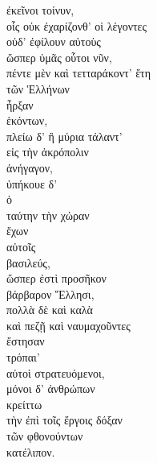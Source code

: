{\large
\begin{greek}
\noindent ἐκεῖνοι τοίνυν, \\
οἷς οὐκ ἐχαρίζονθ' οἱ λέγοντες \\
οὐδ' ἐφίλουν αὐτοὺς \\
ὥσπερ ὑμᾶς οὗτοι νῦν, \\
πέντε μὲν καὶ τετταράκοντ' ἔτη \\
\tabto{2em} τῶν Ἑλλήνων \\
ἦρξαν \\
\tabto{2em} ἑκόντων, \\
πλείω δ' ἢ μύρια τάλαντ' \\
\tabto{2em} εἰς τὴν ἀκρόπολιν \\
ἀνήγαγον, \\
ὑπήκουε δ' \\
ὁ \\
\tabto{2em} ταύτην τὴν χώραν \\
ἔχων \\
αὐτοῖς \\
βασιλεύς, \\
ὥσπερ ἐστὶ προσῆκον \\
\tabto{2em} βάρβαρον Ἕλλησι, \\
πολλὰ δὲ καὶ καλὰ \\
\tabto{2em} καὶ πεζῇ καὶ ναυμαχοῦντες \\
ἔστησαν \\
τρόπαι' \\
αὐτοὶ στρατευόμενοι, \\
μόνοι δ' ἀνθρώπων \\
κρείττω \\
τὴν ἐπὶ τοῖς ἔργοις δόξαν \\
\tabto{2em} τῶν φθονούντων \\
κατέλιπον.\\
\end{greek}
}

